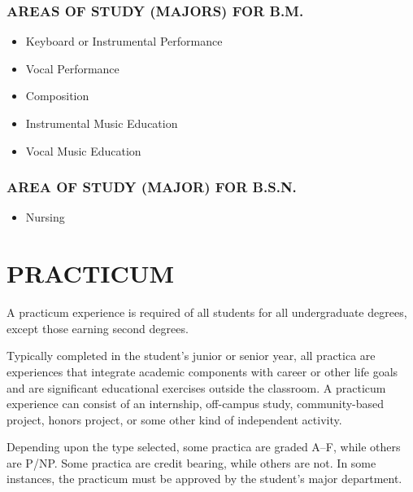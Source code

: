 \documentclass[
  letterpaper,
]{scrbook}
\providecommand{\tightlist}{%
  \setlength{\itemsep}{0pt}\setlength{\parskip}{0pt}}
\begin{document}
\hypertarget{areas-of-study-majors-for-b.m.}{%
\subsection*{AREAS OF STUDY (MAJORS) FOR
B.M.}\label{areas-of-study-majors-for-b.m.}}

\begin{itemize}
\tightlist
\item
  Keyboard or Instrumental Performance
\item
  Vocal Performance
\item
  Composition
\item
  Instrumental Music Education
\item
  Vocal Music Education
\end{itemize}

\hypertarget{area-of-study-major-for-b.s.n.}{%
\subsection*{AREA OF STUDY (MAJOR) FOR
B.S.N.}\label{area-of-study-major-for-b.s.n.}}

\begin{itemize}
\tightlist
\item
  Nursing
\end{itemize}

\hypertarget{practicum}{%
\chapter*{PRACTICUM}\label{practicum}}


A practicum experience is required of all students for all undergraduate
degrees, except those earning second degrees.

Typically completed in the student's junior or senior year, all practica
are experiences that integrate academic components with career or other
life goals and are significant educational exercises outside the
classroom. A practicum experience can consist of an internship,
off-campus study, community-based project, honors project, or some other
kind of independent activity.

Depending upon the type selected, some practica are graded A--F, while
others are P/NP. Some practica are credit bearing, while others are not.
In some instances, the practicum must be approved by the student's major
department.
\end{document}
